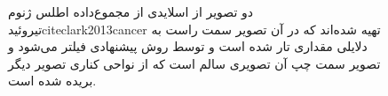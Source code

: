 \begin{itemize}
\begin{figure}
\begin{center}
    	\end{center}
    	\caption[نمونه‌ای از فیلتر تصاویر تار توسط روش گاوسین]
    	{دو تصویر از اسلایدی از مجموع‌داده اطلس ژنوم تیروئیدcite{clark2013cancer} تهیه شده‌‌اند که در آن تصویر سمت راست به دلایلی مقداری تار شده است و توسط روش پیشنهادی فیلتر می‌شود و تصویر سمت چپ آن تصویری سالم است که از نواحی کناری تصویر دیگر بریده شده است.}
    	\label{fig:defocused_sharp_sample_image}
    \end{figure}
    
\end{itemize}
